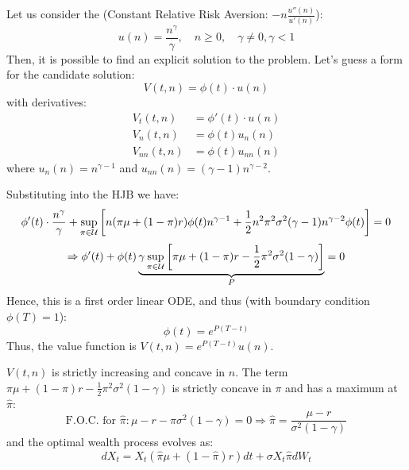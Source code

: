 Let us consider the  (Constant Relative Risk Aversion: $-n \frac{u''(n)}{u'(n)}$):
\begin{equation*}
    u(n) = \frac{n^\gamma}{\gamma}, \quad n \geq 0, \quad \gamma \neq 0, \gamma < 1
\end{equation*}
Then, it is possible to find an explicit solution to the problem. Let's guess a form for the candidate solution:
\begin{equation*}
    V(t,n) = \phi(t) \cdot u(n)
\end{equation*}
with derivatives:
\begin{align*}
    V_t(t,n) &= \phi'(t) \cdot u(n) \\
    V_n(t,n) &= \phi(t) u_n(n) \\
    V_{nn}(t,n) &= \phi(t) u_{nn}(n)
\end{align*}
where $u_n(n) = n^{\gamma-1}$ and $u_{nn}(n) = (\gamma-1) n^{\gamma-2}$.

Substituting into the HJB we have:
\begin{equation*}
    \phi'(t) \cdot \frac{n^\gamma}{\gamma} + \sup_{\pi \in \mathcal{U}} \left[ n (\pi \mu + (1-\pi) r) \phi(t) n^{\gamma-1} + \frac{1}{2} n^2 \pi^2 \sigma^2 (\gamma-1) n^{\gamma-2} \phi(t) \right] = 0
\end{equation*}
\begin{equation*}
    \Rightarrow \phi'(t) + \phi(t) \underbrace{\gamma \sup_{\pi \in \mathcal{U}} \left[ \pi \mu + (1-\pi) r - \frac{1}{2} \pi^2 \sigma^2 (1-\gamma) \right]}_{P} = 0
\end{equation*}
Hence, this is a first order linear ODE, and thus (with boundary condition $\phi(T)=1$):
\begin{equation*}
    \phi(t) = e^{P(T-t)}
\end{equation*}
Thus, the value function is $V(t,n) = e^{P(T-t)} u(n)$.

$V(t,n)$ is strictly increasing and concave in $n$. The term $\pi \mu + (1-\pi) r - \frac{1}{2} \pi^2 \sigma^2 (1-\gamma)$ is strictly concave in $\pi$ and has a maximum at $\hat{\pi}$:
\begin{equation*}
    \text{F.O.C. for } \hat{\pi}: \mu - r - \pi \sigma^2 (1-\gamma) = 0 \Rightarrow \hat{\pi} = \frac{\mu - r}{\sigma^2 (1-\gamma)}
\end{equation*}
and the optimal wealth process evolves as:
\begin{equation*}
    dX_t = X_t (\hat{\pi} \mu + (1-\hat{\pi}) r) dt + \sigma X_t \hat{\pi} dW_t
\end{equation*}

